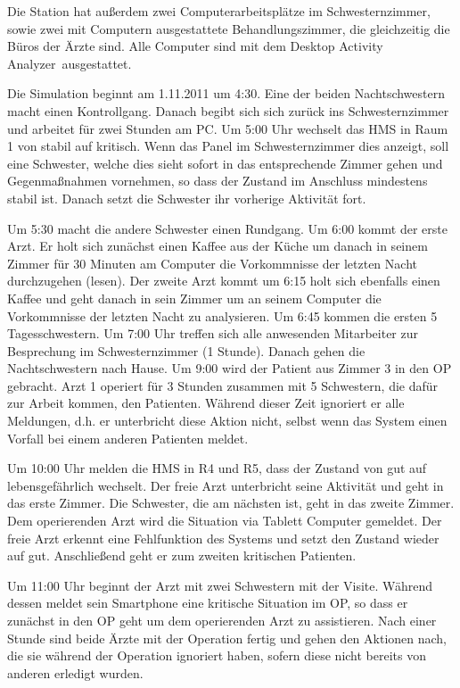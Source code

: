 Die Station hat außerdem zwei Computerarbeitsplätze im Schwesternzimmer, sowie zwei mit Computern ausgestattete Behandlungszimmer, die gleichzeitig die Büros der Ärzte sind. Alle Computer sind mit dem \glqq Desktop Activity Analyzer\grqq\ ausgestattet.

Die Simulation beginnt am 1.11.2011 um 4:30. Eine der beiden Nachtschwestern macht einen Kontrollgang. Danach begibt sich sich zurück ins Schwesternzimmer und arbeitet für zwei Stunden am PC. Um 5:00 Uhr wechselt das HMS in Raum 1 von stabil auf kritisch. Wenn das Panel im Schwesternzimmer dies anzeigt, soll eine Schwester, welche dies sieht sofort in das entsprechende Zimmer gehen und Gegenmaßnahmen vornehmen, so dass der Zustand im Anschluss mindestens stabil ist. Danach setzt die Schwester ihr vorherige Aktivität fort. 

Um 5:30 macht die andere Schwester einen Rundgang. Um 6:00 kommt der erste Arzt. Er holt sich zunächst einen Kaffee aus der Küche um danach in seinem Zimmer für 30 Minuten am Computer die Vorkommnisse der letzten Nacht durchzugehen (lesen). Der zweite Arzt kommt um 6:15 holt sich ebenfalls einen Kaffee und geht danach in sein Zimmer um an seinem Computer die Vorkommnisse der letzten Nacht zu analysieren. Um 6:45 kommen die ersten 5 Tagesschwestern. Um 7:00 Uhr treffen sich alle anwesenden Mitarbeiter zur Besprechung im Schwesternzimmer (1 Stunde). Danach gehen die Nachtschwestern nach Hause. Um 9:00 wird der Patient aus Zimmer 3 in den OP gebracht. Arzt 1 operiert für 3 Stunden zusammen mit 5 Schwestern, die dafür zur Arbeit kommen, den Patienten. Während dieser Zeit ignoriert er alle Meldungen, d.h. er unterbricht diese Aktion nicht, selbst wenn das System einen Vorfall bei einem anderen Patienten meldet.

Um 10:00 Uhr melden die HMS in R4 und R5, dass der Zustand von gut auf lebensgefährlich wechselt. Der freie Arzt unterbricht seine Aktivität und geht in das erste Zimmer. Die Schwester, die am nächsten ist, geht in das zweite Zimmer. Dem operierenden Arzt wird die Situation via Tablett Computer gemeldet. Der freie Arzt erkennt eine Fehlfunktion des Systems und setzt den Zustand wieder auf gut. Anschließend geht er zum zweiten kritischen Patienten. 

Um 11:00 Uhr beginnt der Arzt mit zwei Schwestern mit der Visite. Während dessen meldet sein Smartphone eine kritische Situation im OP, so dass er zunächst in den OP geht um dem operierenden Arzt zu assistieren. Nach einer Stunde sind beide Ärzte mit der Operation fertig und gehen den Aktionen nach, die sie während der Operation ignoriert haben, sofern diese nicht bereits von anderen erledigt wurden.


